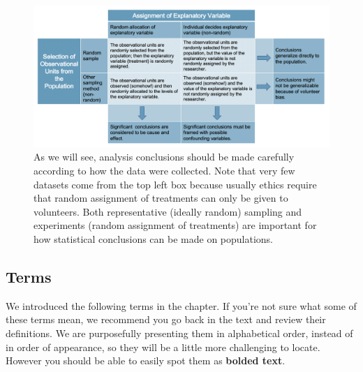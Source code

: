 \documentclass[
  10pt,
  openany]{book}
\begin{document}
\begin{figure}[h]

{\centering \includegraphics[width=1\linewidth]{images/randsampValloc} 

}

\caption{As we will see, analysis conclusions should be made carefully according to how the data were collected.  Note that very few datasets come from the top left box because usually ethics require that random assignment of treatments can only be given to volunteers. Both representative (ideally random) sampling and experiments (random assignment of treatments) are important for how statistical conclusions can be made on populations.}\label{fig:randsampValloc}
\end{figure}

\hypertarget{terms-1}{%
\subsection{Terms}\label{terms-1}}

We introduced the following terms in the chapter.
If you're not sure what some of these terms mean, we recommend you go back in the text and review their definitions.
We are purposefully presenting them in alphabetical order, instead of in order of appearance, so they will be a little more challenging to locate.
However you should be able to easily spot them as \textbf{bolded text}.
\end{document}
